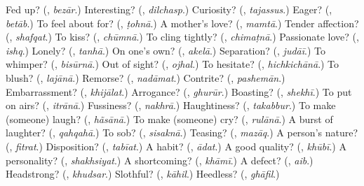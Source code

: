 \begin{tcolorbox}[breakable,colback=teal!4,colframe=teal!35!black,title={Before you move on}]
Fed up? (\textbf{}, \emph{bezār}.) Interesting? (\textbf{}, \emph{dilchasp}.) Curiosity? (\textbf{}, \emph{tajassus}.) Eager? (\textbf{}, \emph{betāb}.) To feel about for? (\textbf{}, \emph{ṭohnā}.) A mother's love? (\textbf{}, \emph{mamtā}.) Tender affection? (\textbf{}, \emph{shafqat}.) To kiss? (\textbf{}, \emph{chūmnā}.) To cling tightly? (\textbf{}, \emph{chimaṭnā}.) Passionate love? (\textbf{}, \emph{ishq}.) Lonely? (\textbf{}, \emph{tanhā}.) On one's own? (\textbf{}, \emph{akelā}.) Separation? (\textbf{}, \emph{judāī}.) To whimper? (\textbf{}, \emph{bisūrnā}.) Out of sight? (\textbf{}, \emph{ojhal}.) To hesitate? (\textbf{}, \emph{hichkichānā}.) To blush? (\textbf{}, \emph{lajānā}.) Remorse? (\textbf{}, \emph{nadāmat}.) Contrite? (\textbf{}, \emph{pashemān}.) Embarrassment? (\textbf{}, \emph{khijālat}.) Arrogance? (\textbf{}, \emph{ghurūr}.) Boasting? (\textbf{}, \emph{shekhī}.) To put on airs? (\textbf{}, \emph{itrānā}.) Fussiness? (\textbf{}, \emph{nakhrā}.) Haughtiness? (\textbf{}, \emph{takabbur}.) To make (someone) laugh? (\textbf{}, \emph{hãsānā}.) To make (someone) cry? (\textbf{}, \emph{rulānā}.) A burst of laughter? (\textbf{}, \emph{qahqahā}.) To sob? (\textbf{}, \emph{sisaknā}.) Teasing? (\textbf{}, \emph{mazāq}.) A person's nature? (\textbf{}, \emph{fitrat}.) Disposition? (\textbf{}, \emph{tabīat}.) A habit? (\textbf{}, \emph{ādat}.) A good quality? (\textbf{}, \emph{khūbī}.) A personality? (\textbf{}, \emph{shakhsiyat}.) A shortcoming? (\textbf{}, \emph{khāmī}.) A defect? (\textbf{}, \emph{aib}.) Headstrong? (\textbf{}, \emph{khudsar}.) Slothful? (\textbf{}, \emph{kāhil}.) Heedless? (\textbf{}, \emph{ghāfil}.)
\end{tcolorbox}
